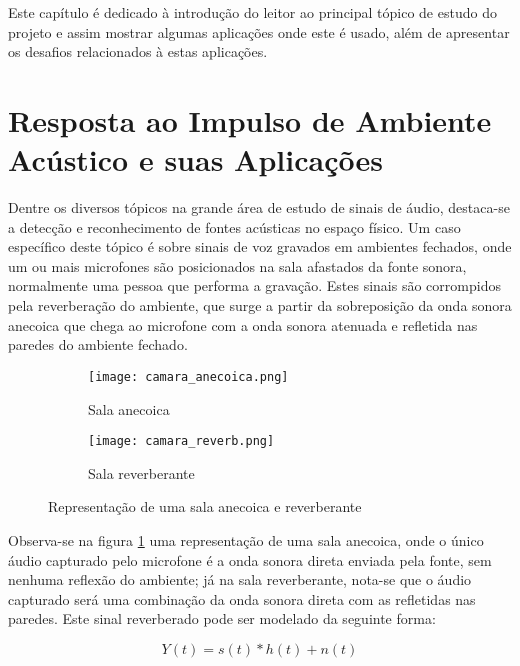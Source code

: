 Este capítulo é dedicado à introdução do leitor ao principal tópico de estudo do projeto e assim mostrar
algumas aplicações onde este é usado, além de apresentar os desafios relacionados à estas aplicações.

\section{Resposta ao Impulso de Ambiente Acústico e suas Aplicações}

Dentre os diversos tópicos na grande área de estudo de sinais de áudio, destaca-se a detecção e reconhecimento de fontes acústicas no espaço físico.
Um caso específico deste tópico é sobre sinais de voz gravados em ambientes fechados, onde um ou mais microfones são posicionados na sala afastados
da fonte sonora, normalmente uma pessoa que performa a gravação.
Estes sinais são corrompidos pela reverberação do ambiente, que surge a partir da sobreposição da onda sonora anecoica que chega ao microfone com a 
onda sonora atenuada e refletida nas paredes do ambiente fechado. 

\begin{figure} [H]
    \begin{subfigure}{.5\textwidth}
        \centering
        \texttt{[image: camara\_anecoica.png]}
        \caption{Sala anecoica}    
    \end{subfigure}
    \begin{subfigure}{.5\textwidth}
        \centering
        \texttt{[image: camara\_reverb.png]}    
        \caption{Sala reverberante}    
    \end{subfigure}
    \caption{Representação de uma sala anecoica e reverberante}
    \label{fig:Rooms}
\end{figure}

Observa-se na figura \ref{fig:Rooms} uma representação de uma sala anecoica, onde o único áudio capturado pelo microfone é a onda sonora direta
enviada pela fonte, sem nenhuma reflexão do ambiente; já na sala reverberante, nota-se que o áudio capturado será uma combinação da onda sonora direta
com as refletidas nas paredes. 
Este sinal reverberado pode ser modelado da seguinte forma:

\begin{equation} \label{eqn:model}
    Y(t) = s(t) \ast h(t) + n(t)
\end{equation}


